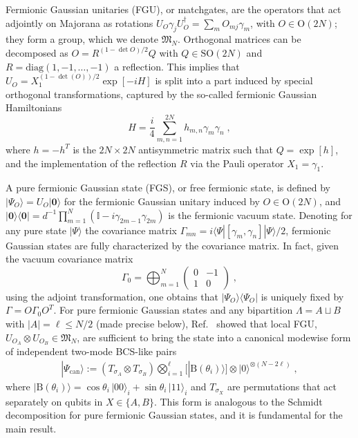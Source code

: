 \documentclass[prx,twocolumn,superscriptaddress,aps,10pt, frontmatterverbose, reprint,footinbib,longbibliography=true]{revtex4-2}
\begin{document}
Fermionic Gaussian unitaries (FGU), or matchgates, are the operators that act adjointly on Majorana as rotations $U_O\gamma_j U_O^\dagger = \sum_{m}O_{mj}\gamma_m$, with $O\in \mathrm{O}(2N)$; they form a group, which we denote $\mathfrak{M}_N$. 
Orthogonal matrices can be decomposed as $O=R^{(1-\det O)/2}Q$ with $Q\in \mathrm{SO}(2N)$ and $R=\mathrm{diag}(1,-1,\dots,-1)$  a reflection.
This implies that $U_O=X_1^{(1-\det(O))/2}\exp[-iH]$ is split into a part induced by special orthogonal transformations, captured by the so-called fermionic Gaussian Hamiltonians 
\begin{equation}
    H= \frac{i}{4}\sum_{m,n=1}^{2N} h_{m,n} \gamma_m\gamma_n\;,\label{eq:ham}
\end{equation}
where $h=-h^T$ is the $2N\times 2N$ antisymmetric matrix such that $Q=\exp[h]$, and the implementation of the reflection $R$ via the Pauli operator $X_1=\gamma_1$. 

A pure fermionic Gaussian state (FGS), or free fermionic state, is defined by $|\Psi_O\rangle=U_O|\mathbf{0}\rangle$ for the fermionic Gaussian unitary induced by $O\in \mathrm{O}(2N)$, and $|\mathbf{0}\rangle\langle\mathbf{0}| = d^{-1}\prod_{m=1}^{N}(\mathbb{I}-i\gamma_{2m-1}\gamma_{2m})$ is the fermionic vacuum state. 
Denoting for any pure state $|\Psi\rangle$ the covariance matrix $\Gamma_{mn}=i\langle \Psi|[\gamma_m,\gamma_n]|\Psi\rangle/2$, fermionic Gaussian states are fully characterized by the covariance matrix. In fact, given the vacuum covariance matrix
\begin{equation}
    \Gamma_0= { \bigoplus_{m=1}^N \begin{pmatrix}
        0 &-1 \\1&0
    \end{pmatrix}}\;,
\end{equation}
using the adjoint transformation, one obtains that $|\Psi_O\rangle\langle \Psi_O|$ is uniquely fixed by $\Gamma= O\Gamma_0 O^T$. 
For pure fermionic Gaussian states and any bipartition $\Lambda=A\sqcup B$ with $|A|=\ell\le N/2$ (made precise below), Ref.~\cite{BoteroReznik2004} showed that local FGU, $U_{O_A} \otimes U_{O_B}\in \mathfrak{M}_{N}$, are sufficient to bring the state into a canonical modewise form of independent two-mode BCS-like pairs 
\begin{equation}
\begin{split}
     |\Psi_{\mathrm{can}}\rangle
:= (T_{\sigma_{A}}\otimes T_{\sigma_{B}})\bigotimes_{i=1}^{\ell} [|\mathrm{B}(\theta_i)\rangle]\otimes |0\rangle^{\otimes (N-2\ell)}\;,
\end{split}
\label{eq:can_form}
\end{equation} 
where $|\mathrm{B}(\theta_i)\rangle=\cos\theta_i\,|00\rangle_i+\sin\theta_i\,|11\rangle_i$  and $T_{\sigma_X}$ are permutations that act separately on qubits in $X\in \{A,B\}$. This form is analogous to the Schmidt decomposition for pure fermionic Gaussian states, and it is fundamental for the main result.
\end{document}

